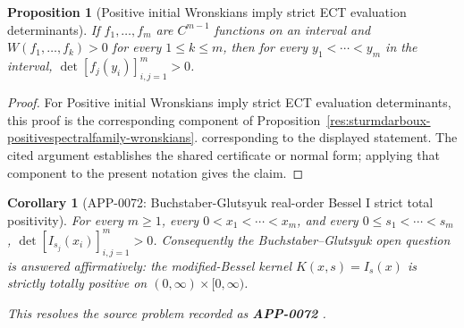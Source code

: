 \documentclass[11pt]{article}
\numberwithin{equation}{section}
\newtheorem{proposition}[theorem]{Proposition}
\newtheorem{corollary}[theorem]{Corollary}
\theoremstyle{definition}
\theoremstyle{remark}
\newcommand{\1}{\mathbf 1}
\begin{document}
\begin{proposition}[Positive initial Wronskians imply strict ECT evaluation determinants]
\label{res:positivewronskians-ect-determinants}
If \(f_1,\ldots,f_m\) are \(C^{m-1}\) functions on an interval and \(W(f_1,\ldots,f_k)>0\) for every \(1\le k\le m\), then for every \(y_1<\cdots<y_m\) in the interval, \(\det[f_j(y_i)]_{i,j=1}^m>0\).
\end{proposition}

\begin{proof}
For Positive initial Wronskians imply strict ECT evaluation determinants, this proof is the corresponding component of Proposition~\ref{res:sturmdarboux-positivespectralfamily-wronskians}.  corresponding to the displayed statement.  The cited argument establishes the shared certificate or normal form; applying that component to the present notation gives the claim.
\end{proof}

\begin{corollary}[APP-0072: Buchstaber-Glutsyuk real-order Bessel I strict total positivity]
\label{res:besseli-realorder-stricttotalpositivity}
For every \(m\ge1\), every \(0<x_1<\cdots<x_m\), and every \(0\le s_1<\cdots<s_m\), \(\det[I_{s_j}(x_i)]_{i,j=1}^m>0\). Consequently the Buchstaber--Glutsyuk open question is answered affirmatively: the modified-Bessel kernel \(K(x,s)=I_s(x)\) is strictly totally positive on \((0,\infty)\times[0,\infty)\).



This resolves the source problem recorded as \textbf{APP-0072} \cite{app-app-0072-source}.
\end{corollary}
\end{document}
